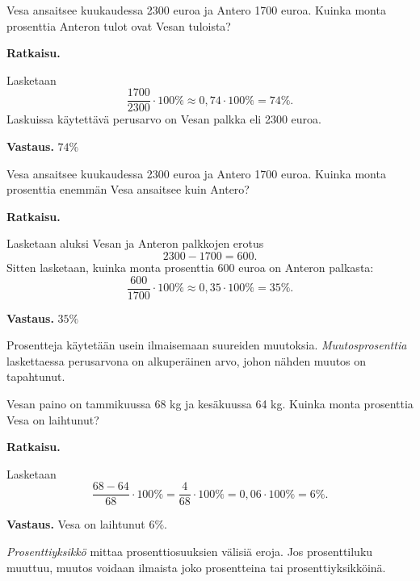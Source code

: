 

\begin{esimerkki}
	Vesa ansaitsee kuukaudessa 2300 euroa ja Antero 1700 euroa.
    Kuinka monta prosenttia Anteron tulot ovat Vesan tuloista? 
    
    {\bf Ratkaisu.}
    
    Lasketaan
    \[
    \frac{1700}{2300} \cdot 100 \% \approx 0,74\cdot 100 \% = 74 \%.
    \]
    Laskuissa käytettävä perusarvo on Vesan palkka eli 2300 euroa.
    
    {\bf Vastaus.}
     $74 \%$
\end{esimerkki}


\begin{esimerkki}
    Vesa ansaitsee kuukaudessa 2300 euroa ja Antero 1700 euroa.
    Kuinka monta prosenttia enemmän Vesa ansaitsee kuin Antero?
    
    {\bf Ratkaisu.}
    
    Lasketaan aluksi Vesan ja Anteron palkkojen erotus
    \[
    2300-1700 = 600.
    \]
    Sitten lasketaan, kuinka monta prosenttia 600 euroa on Anteron palkasta:
    \[
    \frac{600}{1700} \cdot 100 \% \approx 0,35\cdot 100\% = 35 \%.
    \]
    
    {\bf Vastaus.}
    $35 \%$
\end{esimerkki}

Prosentteja käytetään usein ilmaisemaan suureiden muutoksia. \emph{Muutosprosenttia} laskettaessa perusarvona on alkuperäinen arvo, johon nähden muutos on tapahtunut.

\begin{esimerkki}
    Vesan paino on tammikuussa 68 kg ja kesäkuussa 64 kg. Kuinka monta prosenttia Vesa on laihtunut?

    {\bf Ratkaisu.}

    Lasketaan 
    \[
    \frac{68-64}{68}\cdot 100\% = \frac{4}{68} \cdot 100\%=0,06\cdot 100\% = 6\%.
    \]
    
    {\bf Vastaus.}
    Vesa on laihtunut $6\%$.
\end{esimerkki}


\emph{Prosenttiyksikkö} mittaa prosenttiosuuksien välisiä eroja. Jos prosenttiluku muuttuu, muutos voidaan ilmaista joko prosentteina tai prosenttiyksikköinä.


